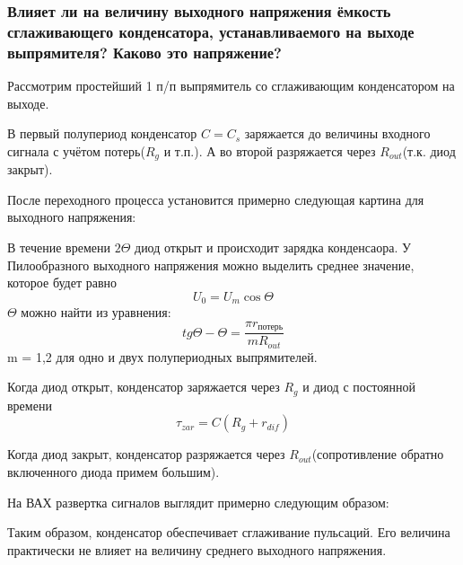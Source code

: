 \subsubsection{Влияет ли на величину выходного напряжения ёмкость сглаживающего конденсатора, устанавливаемого на выходе выпрямителя? Каково это напряжение?}

Рассмотрим простейший 1 п/п выпрямитель со сглаживающим конденсатором на выходе.
\begin{center}
	\begin{figure}[h!]
		\caption{}	
	\end{figure}
\end{center}

В первый полупериод конденсатор $C = C_{s}$ заряжается до величины входного сигнала с учётом потерь($R_g$ и т.п.). А во второй разряжается через $R_{out}$(т.к. диод закрыт).

После переходного процесса установится примерно следующая картина для выходного напряжения: 
\begin{center}
	\begin{figure}[h!]
		\caption{}	
	\end{figure}
\end{center}

В течение времени $2\Theta$ диод открыт и  происходит зарядка конденсаора. У Пилообразного выходного напряжения можно выделить среднее значение, которое будет равно 
$$
U_0 = U_m\cos\Theta
$$
$\Theta$ можно найти из уравнения:
$$
tg\Theta - \Theta = \frac{\pi r_{\textit{потерь}}}{mR_{out}}
$$
m = 1,2 для одно и двух полупериодных выпрямителей.

Когда диод открыт, конденсатор заряжается через $R_g$ и диод с постоянной времени
$$
\tau_{zar} = C(R_g + r_{dif})
$$

Когда диод закрыт, конденсатор разряжается через $R_{out}$(сопротивление обратно включенного диода примем большим).

На ВАХ развертка сигналов выглядит примерно следующим образом:
\begin{center}
	\begin{figure}[h!]
		\caption{}	
	\end{figure}
\end{center}

Таким образом, конденсатор обеспечивает сглаживание пульсаций. Его величина практически не влияет на величину среднего выходного напряжения.